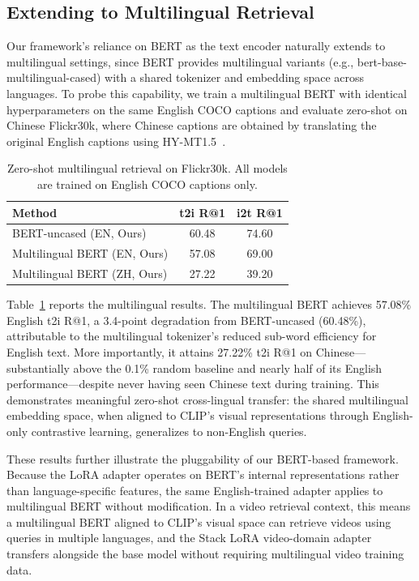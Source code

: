 \documentclass[10pt,leqno]{amsart}
\begin{document}
\subsection{Extending to Multilingual Retrieval}

Our framework's reliance on BERT as the text encoder naturally extends to multilingual settings, since BERT provides multilingual variants (e.g., bert-base-multilingual-cased) with a shared tokenizer and embedding space across languages. To probe this capability, we train a multilingual BERT with identical hyperparameters on the same English COCO captions and evaluate zero-shot on Chinese Flickr30k, where Chinese captions are obtained by translating the original English captions using HY-MT1.5~\citep{hymt152025tencent}.

\begin{table}[h]
\centering
\caption{Zero-shot multilingual retrieval on Flickr30k. All models are trained on English COCO captions only.}
\label{tab:multilingual}
\begin{tabular}{lcc}
\toprule
Method & t2i R@1 & i2t R@1 \\
\midrule
BERT-uncased (EN, Ours) & 60.48 & 74.60 \\
Multilingual BERT (EN, Ours) & 57.08 & 69.00 \\
Multilingual BERT (ZH, Ours) & 27.22 & 39.20 \\
\bottomrule
\end{tabular}
\end{table}

Table~\ref{tab:multilingual} reports the multilingual results. The multilingual BERT achieves 57.08\% English t2i R@1, a 3.4-point degradation from BERT-uncased (60.48\%), attributable to the multilingual tokenizer's reduced sub-word efficiency for English text. More importantly, it attains 27.22\% t2i R@1 on Chinese---substantially above the 0.1\% random baseline and nearly half of its English performance---despite never having seen Chinese text during training. This demonstrates meaningful zero-shot cross-lingual transfer: the shared multilingual embedding space, when aligned to CLIP's visual representations through English-only contrastive learning, generalizes to non-English queries.

These results further illustrate the pluggability of our BERT-based framework. Because the LoRA adapter operates on BERT's internal representations rather than language-specific features, the same English-trained adapter applies to multilingual BERT without modification. In a video retrieval context, this means a multilingual BERT aligned to CLIP's visual space can retrieve videos using queries in multiple languages, and the Stack LoRA video-domain adapter transfers alongside the base model without requiring multilingual video training data.
\end{document}

